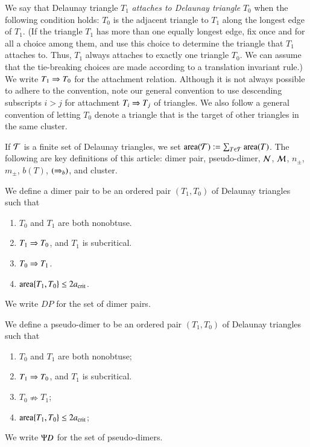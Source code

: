 We say that Delaunay triangle $T_1$ {\it attaches to Delaunay
  triangle} $T_0$ when the following condition holds: $T_0$ is the
adjacent triangle to $T_1$ along the longest edge of $T_1$.  (If the
triangle $T_1$ has more than one equally longest edge, fix once and
for all a choice among them, and use this choice to determine the
triangle that $T_1$ attaches to.  Thus, $T_1$ always attaches to
exactly one triangle $T_0$.  We can assume that the tie-breaking
choices are made according to a translation invariant rule.)  We write
$T_1 \Rightarrow T_0$ for the attachment relation.  Although it is not always
possible to adhere to the convention, note our general convention to
use descending subscripts $i > j$ for attachment $T_i\Rightarrow T_j$ of
triangles.  We also follow a general convention of letting $T_0$ denote
a triangle that is the target of other triangles in the same cluster.

If $\mathcal T$ is a finite set of Delaunay triangles, we set
${\operatorname{area}}(\mathcal T):=\sum_{T\in\mathcal T} {\operatorname{area}}(T)$.  The following are key
definitions of this article: dimer pair, pseudo-dimer, $\mathcal N$, $\mathcal M$,
$n_\pm$, $m_\pm$, $b(T)$, $(\Rightarrow_{b})$, and cluster.

\begin{definition}
  We define a dimer pair to be an ordered pair $(T_1,T_0)$ of Delaunay
  triangles such that
\begin{enumerate}
\item $T_0$ and $T_1$ are both nonobtuse.
\item $T_1\Rightarrow T_0$, and $T_1$ is subcritical.
\item $T_0 \Rightarrow T_1$.
\item ${\operatorname{area}}\{T_1,T_0\} \le 2a_\text{crit}$.
\end{enumerate}
We write $DP$ for the set of dimer pairs.
\end{definition}

\begin{definition}
  We define a pseudo-dimer to be an ordered pair $(T_1,T_0)$ of
  Delaunay triangles such that
\begin{enumerate}
\item $T_0$ and $T_1$ are both nonobtuse;
\item $T_1\Rightarrow T_0$, and  $T_1$ is subcritical.
\item $T_0 \nRightarrow T_1$;
\item ${\operatorname{area}}\{T_1,T_0\} \le 2a_\text{crit}$;
\end{enumerate}
We write $\Psi D$ for the set of pseudo-dimers.
\end{definition}

